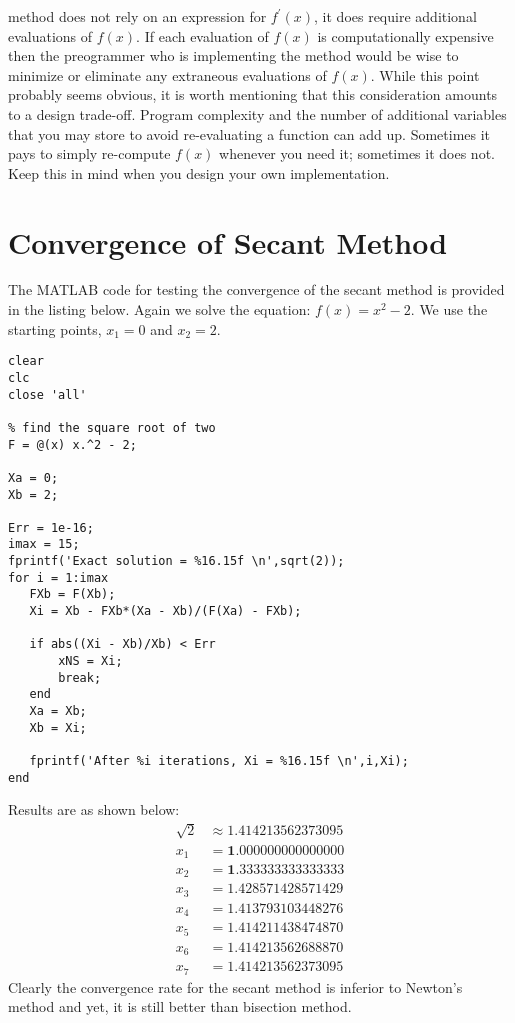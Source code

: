  method does not rely on an expression for $f^{\prime}(x)$, it does require additional evaluations of $f(x)$.  If each evaluation of $f(x)$ is computationally expensive then the preogrammer who is implementing the method would be wise to minimize or eliminate any extraneous evaluations of $f(x)$.  While this point probably seems obvious, it is worth mentioning that this consideration amounts to a design trade-off.  Program complexity and the number of additional variables that you may store to avoid re-evaluating a function can add up.  Sometimes it pays to simply re-compute $f(x)$ whenever you need it; sometimes it does not.  Keep this in mind when you design your own implementation.

\section{Convergence of Secant Method}
The MATLAB code for testing the convergence of the secant method is provided in the listing below. Again we solve the equation: $f(x) = x^2 - 2$.  We use the starting points, $x_1 = 0$ and $x_2 = 2$.

\begin{lstlisting}[name=lec4n-ex2, style=myMatlab]
clear
clc
close 'all'

% find the square root of two
F = @(x) x.^2 - 2;

Xa = 0; 
Xb = 2;

Err = 1e-16;
imax = 15;
fprintf('Exact solution = %16.15f \n',sqrt(2));
for i = 1:imax
   FXb = F(Xb);
   Xi = Xb - FXb*(Xa - Xb)/(F(Xa) - FXb);
   
   if abs((Xi - Xb)/Xb) < Err
       xNS = Xi;
       break;
   end
   Xa = Xb;
   Xb = Xi;
   
   fprintf('After %i iterations, Xi = %16.15f \n',i,Xi);          
end
\end{lstlisting}
Results are as shown below:
\begin{align*}
\sqrt{2} &\approx 1.414213562373095 \\
x_1 &= \mathbf{1.}000000000000000 \\
x_2 &= \mathbf{1.}333333333333333 \\
x_3 &= \mathbf{1.4}28571428571429 \\
x_4 &= \mathbf{1.41}3793103448276 \\
x_5 &= \mathbf{1.41421}1438474870 \\
x_6 &= \mathbf{1.414213562}688870 \\
x_7 &= \mathbf{1.414213562373095}
\end{align*}
Clearly the convergence rate for the secant method is inferior to Newton's method and yet, it is still better than bisection method.

